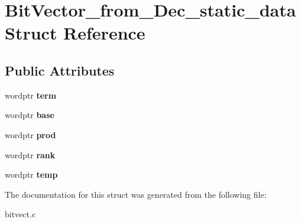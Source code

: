 \hypertarget{struct_bit_vector__from___dec__static__data}{\section{Bit\-Vector\-\_\-from\-\_\-\-Dec\-\_\-static\-\_\-data Struct Reference}
\label{struct_bit_vector__from___dec__static__data}
}
\subsection*{Public Attributes}
\begin{DoxyCompactItemize}
\item 
\hypertarget{struct_bit_vector__from___dec__static__data_ac54f1851342d8eea5754cee0b77fde7a}{wordptr {\bfseries term}}\label{struct_bit_vector__from___dec__static__data_ac54f1851342d8eea5754cee0b77fde7a}

\item 
\hypertarget{struct_bit_vector__from___dec__static__data_ab313e388c5dc6b09794ddf9b27a5b845}{wordptr {\bfseries base}}\label{struct_bit_vector__from___dec__static__data_ab313e388c5dc6b09794ddf9b27a5b845}

\item 
\hypertarget{struct_bit_vector__from___dec__static__data_a6edcac35076b0314ffc70ca9da4fd8f6}{wordptr {\bfseries prod}}\label{struct_bit_vector__from___dec__static__data_a6edcac35076b0314ffc70ca9da4fd8f6}

\item 
\hypertarget{struct_bit_vector__from___dec__static__data_ab6f84412bf47b49ad37ec0110e57ec70}{wordptr {\bfseries rank}}\label{struct_bit_vector__from___dec__static__data_ab6f84412bf47b49ad37ec0110e57ec70}

\item 
\hypertarget{struct_bit_vector__from___dec__static__data_af5311611e49d5ada98f51256b553f2e8}{wordptr {\bfseries temp}}\label{struct_bit_vector__from___dec__static__data_af5311611e49d5ada98f51256b553f2e8}

\end{DoxyCompactItemize}


The documentation for this struct was generated from the following file\-:\begin{DoxyCompactItemize}
\item 
bitvect.\-c\end{DoxyCompactItemize}
